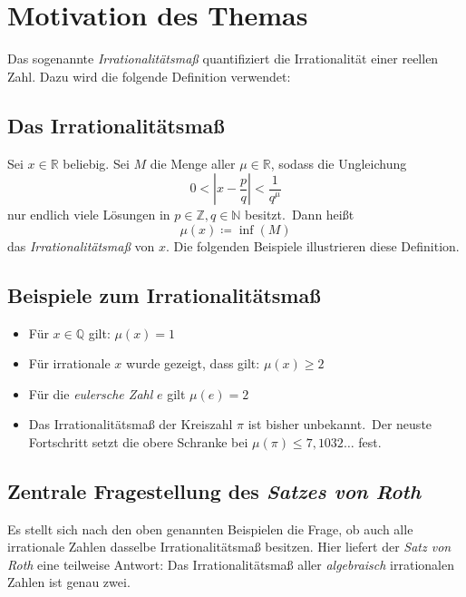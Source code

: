
\section{Motivation des Themas}
    \label{sec:motivation}
    \textrm{Das sogenannte \emph{Irrationalitätsmaß} quantifiziert die Irrationalität einer reellen Zahl. Dazu wird
    die folgende Definition verwendet:}
    
    \subsection{\textrm{Das Irrationalitätsmaß}}
        \label{subsec:irr-measure}
        \textrm{Sei $x \in \mathbb{R}$ beliebig. Sei $M$ die Menge aller $\mu \in \mathbb{R}$, sodass die Ungleichung
            \begin{equation*}
                0 < \left| x - \frac{p}{q} \right| < \frac{1}{q^\mu}
            \end{equation*}
            nur endlich viele Lösungen in $p \in \mathbb{Z}, q \in \mathbb{N}$
            besitzt.\ Dann heißt
            \begin{equation*}
                \mu(x) \coloneqq \inf(M)
            \end{equation*}
            das \emph{Irrationalitätsmaß} von $x$.
            \newline
            Die folgenden Beispiele illustrieren diese Definition.}
    
    \subsection{\textrm{Beispiele zum Irrationalitätsmaß}}
        \label{subsec:examples-irr-measure}
        \begin{itemize}
            \item \textrm{Für $x \in \mathbb{Q}$ gilt: $\mu(x) = 1$}
            \item \textrm{Für irrationale $x$ wurde gezeigt, dass gilt: $\mu(x) \geq 2$}
            \item \textrm{Für die \emph{eulersche Zahl} $e$ gilt $\mu(e) = 2$}
            \item \textrm{Das Irrationalitätsmaß der Kreiszahl $\pi$ ist bisher unbekannt.\ Der neuste Fortschritt
            setzt die obere Schranke bei $\mu(\pi) \leq 7,1032\dots$ fest.}
        \end{itemize}
    
    \subsection{Zentrale Fragestellung des \emph{Satzes von Roth}}
        \label{subsec:question}
        \textrm{Es stellt sich nach den oben genannten Beispielen die Frage, ob auch alle irrationale Zahlen dasselbe
        Irrationalitätsmaß besitzen. Hier liefert der \emph{Satz von Roth} eine teilweise Antwort:
        \newline
        Das Irrationalitätsmaß aller \emph{algebraisch} irrationalen Zahlen ist genau zwei.}
    

